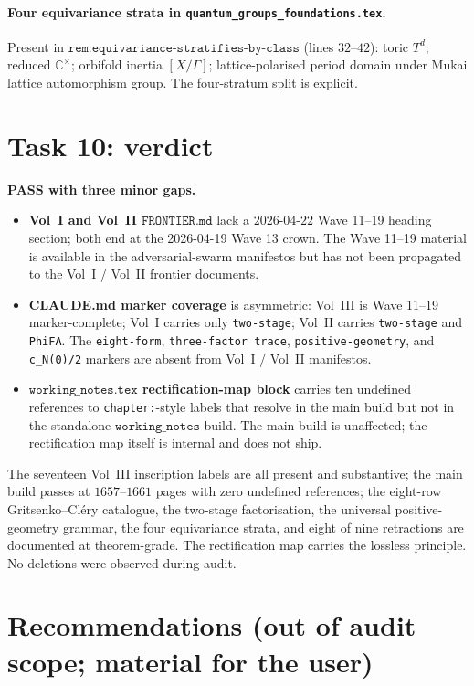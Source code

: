 \documentclass[11pt]{article}
\begin{document}
\paragraph{Four equivariance strata in
\texttt{quantum\_groups\_foundations.tex}.} Present in
$\texttt{rem:equivariance-stratifies-by-class}$ (lines $32$--$42$):
toric $T^d$; reduced $\mathbb{C}^\times$; orbifold inertia
$[X/\Gamma]$; lattice-polarised period domain under Mukai lattice
automorphism group. The four-stratum split is explicit.

\section{Task 10: verdict}

\textbf{PASS with three minor gaps.}

\begin{itemize}
\item \textbf{Vol~I and Vol~II $\texttt{FRONTIER.md}$} lack a
$2026\text{-}04\text{-}22$ Wave 11--19 heading section; both end
at the 2026-04-19 Wave 13 crown. The Wave 11--19 material is
available in the adversarial-swarm manifestos but has not been
propagated to the Vol~I / Vol~II frontier documents.
\item \textbf{CLAUDE.md marker coverage} is asymmetric: Vol~III is
Wave 11--19 marker-complete; Vol~I carries only
\texttt{two-stage}; Vol~II carries \texttt{two-stage} and
\texttt{PhiFA}. The \texttt{eight-form}, \texttt{three-factor
trace}, \texttt{positive-geometry}, and \texttt{c\_N(0)/2}
markers are absent from Vol~I / Vol~II manifestos.
\item \textbf{$\texttt{working\_notes.tex}$ rectification-map
block} carries ten undefined references to
\texttt{chapter:}-style labels that resolve in the main build but
not in the standalone $\texttt{working\_notes}$ build. The main
build is unaffected; the rectification map itself is internal
and does not ship.
\end{itemize}

The seventeen Vol~III inscription labels are all present and
substantive; the main build passes at $1657$--$1661$ pages with
zero undefined references; the eight-row Gritsenko--Cl\'ery
catalogue, the two-stage factorisation, the universal
positive-geometry grammar, the four equivariance strata, and
eight of nine retractions are documented at theorem-grade. The
rectification map carries the lossless principle. No deletions
were observed during audit.

\section{Recommendations (out of audit scope; material for the user)}
\end{document}

